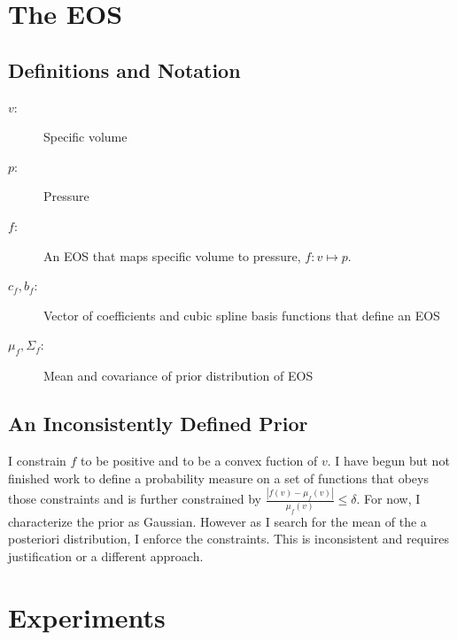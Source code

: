 \documentclass[11pt]{article}
\newcommand\vol{v}        %
\newcommand{\pressure}{p}
\newcommand{\eos}{f}
\newcommand\cf{c_f}
\newcommand\fbasis{b_f}
\begin{document}
\section{The EOS}
\label{sec:eos}

\subsection{Definitions and Notation}
\label{sec:eos-notation}

\begin{description}
\item[$\vol$:] Specific volume
\item[$\pressure$:] Pressure
\item[$\eos$:] An EOS that maps specific volume to pressure, $\eos: \vol
  \mapsto \pressure$.
\item[$\cf,\fbasis$:] Vector of coefficients and cubic spline basis
  functions that define an EOS
\item[$\mu_\eos, \Sigma_\eos$:] Mean and covariance of prior
  distribution of EOS
\end{description}

\subsection{An Inconsistently Defined Prior}
\label{sec:eos-prior}

I constrain $\eos$ to be positive and to be a convex fuction of
$\vol$.  I have begun but not finished work to define a probability
measure on a set of functions that obeys those constraints and is
further constrained by $\frac{\left| \eos(\vol) - \mu_\eos(\vol)
  \right|}{\mu_\eos(\vol)} \leq \delta$.  For now, I characterize the
prior as Gaussian.  However as I search for the mean of the a
posteriori distribution, I enforce the constraints.  This is
inconsistent and requires justification or a different approach.

\section{Experiments}
\label{sec:experiments}
\end{document}
